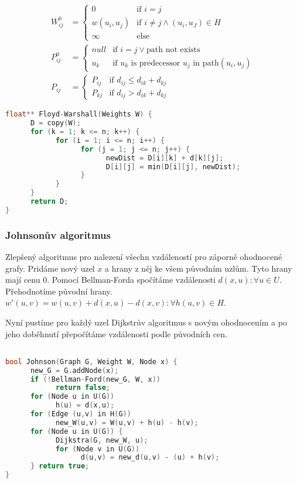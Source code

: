 \documentclass[12pt]{article}
\begin{document}
\begin{align*}
    W_{ij}^0 &=
\left\{
      \begin{array}{ll}
            0  & \mbox{if } i = j \\
            w(u_i, u_j) & \mbox{if } i \neq j \land (u_i, u_J) \in H\\
            \infty & \mbox{else }
      \end{array}
\right.\\
P_{ij}^0 &=
\left\{
      \begin{array}{ll}
            null  & \mbox{if } i = j \lor \text{path not exists}\\
            u_k & \mbox{if } u_k\text{ is predecessor }u_j\text{ in path} (u_i, u_j)
      \end{array}
\right.\\
P_{ij} &=
\left\{
      \begin{array}{ll}
            P_{ij}  & \mbox{if } d_{ij} \leq d_{ik} + d_{kj}\\
            P_{kj} & \mbox{if } d_{ij} > d_{ik} + d_{kj}
      \end{array}
\right.
\end{align*}

\begin{lstlisting}[language=c]
float** Floyd-Warshall(Weights W) {
      D = copy(W);
      for (k = 1; k <= n; k++) {
            for (i = 1; i <= n; i++) {
                  for (j = 1; j <= n; j++) {
                        newDist = D[i][k] + d[k][j];
                        D[i][j] = min(D[i][j], newDist);
                  }
            }
      }
      return D;
}
\end{lstlisting}


\subsubsection{Johnsonův algoritmus}
Zlepšený algoritmus pro nalezení všechn vzdáleností pro záporně ohodnocené grafy. Pridáme nový uzel $x$ a hrany z něj ke všem původním uzlům. Tyto hrany mají cenu $0$. Pomocí Bellman-Forda spočítáme vzdálenosti $d(x, u) : \forall u \in U$. Přehodnotíme původní hrany. $w'(u, v) = w(u, v) + d(x, u) - d(x, v): \forall h(u, v) \in H$.

Nyní pustíme pro každý uzel Dijkstrův algoritmus s novým ohodnocením a po jeho doběhnutí přepočítáme vzdálenosti podle původních cen.

\begin{lstlisting}[language=c++]

bool Johnson(Graph G, Weight W, Node x) {
      new_G = G.addNode(x);
      if (!Bellman-Ford(new_G, W, x))
            return false;
      for (Node u in U(G))
            h(u) = d(x,u);
      for (Edge (u,v) in H(G))
            new_W(u,v) = W(u,v) + h(u) - h(v);
      for (Node u in U(G)) {
            Dijkstra(G, new_W, u);
            for (Node v in U(G)) 
                  d(u,v) = new_d(u,v) - (u) + h(v);
      } return true;
}
\end{lstlisting}
\end{document}
